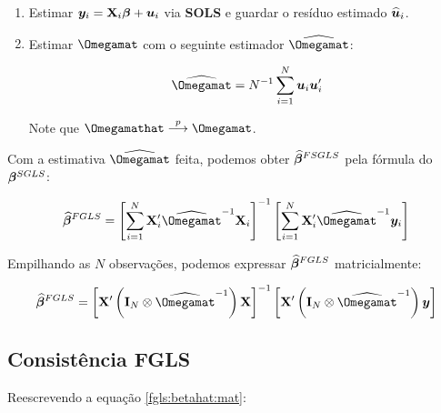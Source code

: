 \documentclass[11pt, oneside, a4paper, article]{article}
\numberwithin{equation}{section}
\begin{document}
\begin{description}
\begin{enumerate}
\item  %
Estimar $\boldsymbol{y}_{i} = \mathbf{X}_{i} \boldsymbol{\beta} + \boldsymbol{u}_{i}$ via \textbf{SOLS} e guardar o resíduo estimado $\widehat{\boldsymbol{u}}_{i}$.

\item  %
Estimar $\Omegamat$ com o seguinte estimador $\widehat{\Omegamat}$:

\vspace{-1.5 em}
\begin{align*}
\widehat{\Omegamat} 
= 
N^{-1} \sum_{i=1}^{N} \uvec_{i} \uvec_{i}'
\end{align*}

\noindent
Note que $\Omegamathat \arrowp \Omegamat$.
\end{enumerate}

Com a estimativa $\widehat{\Omegamat}$ feita, podemos obter $\widehat{\boldsymbol{\beta}}^{FSGLS}$ pela fórmula do $\boldsymbol{\beta}^{SGLS}$:

\vspace{-1.5 em}
\begin{align}
\label{fgls:betahat}
\betavechat^{FGLS}
= 
\left[ \sum_{i=1}^{N} \Xmat_{i}' \widehat{\Omegamat}^{-1} \Xmat_{i} \right]^{-1}
\left[ \sum_{i=1}^{N} \Xmat_{i}' \widehat{\Omegamat}^{-1} \yvec_{i} \right]
\end{align}

Empilhando as $N$ observações, podemos expressar $\widehat{\boldsymbol{\beta}}^{FGLS}$ matricialmente:

\vspace{-1.5 em}
\begin{align}
\label{fgls:betahat:mat}
\betavechat^{FGLS}
= 
\left[ \Xmat' \left( \Imat_{N} \otimes \widehat{\Omegamat}^{-1} \right) \Xmat \right]^{-1}
\left[ \Xmat' \left( \Imat_{N} \otimes \widehat{\Omegamat}^{-1} \right) \yvec \right]
\end{align}

\subsection{Consistência FGLS}
Reescrevendo a equação \eqref{fgls:betahat:mat}:


\end{description}
\end{document}
